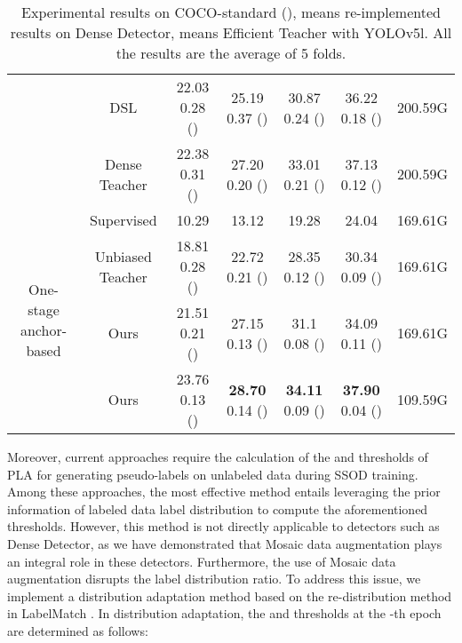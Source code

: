 \documentclass[10pt,twocolumn,letterpaper]{article}
\begin{document}
\begin{table*}[ht]
{{\begin{tabular}{c|c|ccccc}
    & DSL\cite{chen2022dense} & 22.03  0.28 \small{(\textcolor{blue}{})} & 25.19  0.37 \small{(\textcolor{blue}{})} & 30.87  0.24 \small{(\textcolor{blue}{})} & 36.22  0.18 \small{(\textcolor{blue}{})} & 200.59G\\
    & Dense Teacher\cite{zhou2022dense} & 22.38  0.31 \small{(\textcolor{blue}{})} & 27.20  0.20 \small{(\textcolor{blue}{})} & 33.01  0.21 \small{(\textcolor{blue}{})} & 37.13  0.12 \small{(\textcolor{blue}{})} & 200.59G\\
    \midrule
     \multirow{5}{*}{One-stage anchor-based} & Supervised & 10.29 & 13.12 & 19.28 & 24.04 & 169.61G\\
    & Unbiased Teacher\cite{liu2021unbiased} & 18.81  0.28 \small{(\textcolor{blue}{})} & 22.72  0.21 \small{(\textcolor{blue}{})} & 28.35  0.12 \small{(\textcolor{blue}{})} & 30.34  0.09 \small{(\textcolor{blue}{})} & 169.61G\\   
    & Ours  & 21.51  0.21 \small{(\textcolor{blue}{})} & 27.15  0.13 \small{(\textcolor{blue}{})} & 31.1  0.08 \small{(\textcolor{blue}{})} & 34.09  0.11 \small{(\textcolor{blue}{})} & 169.61G\\
    & Ours   & 23.76  0.13 \small{(\textcolor{blue}{})} & \textbf{28.70}  0.14 \small{(\textcolor{blue}{})} & \textbf{34.11}  0.09 \small{(\textcolor{blue}{})}  & \textbf{37.90}  0.04 \small{(\textcolor{blue}{})} & 109.59G\\


    \bottomrule
  \end{tabular}
  }}
  \caption{Experimental results on COCO-standard (),  means re-implemented
results on Dense Detector,  means Efficient Teacher with YOLOv5l\cite{jocher2022ultralytics}. All the results are the average of 5 folds.}
  \label{tab:coco standard}
\end{table*}
Moreover, current approaches require the calculation of the  and  thresholds of PLA for generating pseudo-labels on unlabeled data during SSOD training. Among these approaches, the most effective method\cite{chen2022label} entails leveraging the prior information of labeled data label distribution to compute the aforementioned thresholds. However, this method is not directly applicable to detectors such as Dense Detector, as we have demonstrated that Mosaic data augmentation plays an integral role in these detectors. Furthermore, the use of Mosaic data augmentation disrupts the label distribution ratio. To address this issue, we implement a distribution adaptation method based on the re-distribution method in LabelMatch \cite{chen2022label}. In distribution adaptation, the  and  thresholds at the -th epoch are determined as follows:
\end{document}

